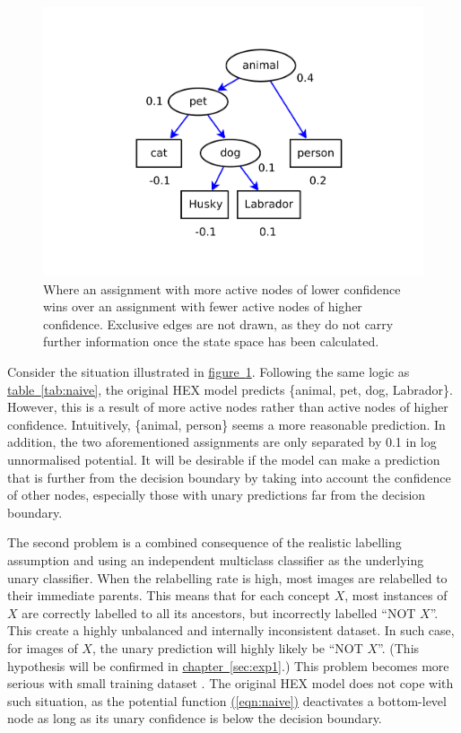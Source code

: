 \documentclass[11pt,a4paper]{book}
\begin{document}
\begin{figure}[htbp]
\centering\includegraphics[scale=0.5]{depth.pdf}
\caption{Where an assignment with more active nodes of lower confidence wins over an assignment with fewer active nodes of higher confidence. Exclusive edges are not drawn, as they do not carry further information once the state space has been calculated.}
\label{fig:depth}
\end{figure}

Consider the situation illustrated in \hyperref[fig:depth]{figure~\ref{fig:depth}}. Following the same logic as \hyperref[tab:naive]{table~\ref{tab:naive}}, the original HEX model predicts \{animal, pet, dog, Labrador\}. However, this is a result of more active nodes rather than active nodes of higher confidence. Intuitively, \{animal, person\} seems a more reasonable prediction. In addition, the two aforementioned assignments are only separated by 0.1 in log unnormalised potential. It will be desirable if the model can make a prediction that is further from the decision boundary by taking into account the confidence of other nodes, especially those with unary predictions far from the decision boundary.

The second problem is a combined consequence of the realistic labelling assumption and using an independent multiclass classifier as the underlying unary classifier. When the relabelling rate is high, most images are relabelled to their immediate parents. This means that for each concept $X$, most instances of $X$ are correctly labelled to all its ancestors, but incorrectly labelled ``NOT $X$''. This create a highly unbalanced and internally inconsistent dataset. In such case, for images of $X$, the unary prediction will highly likely be ``NOT $X$''. (This hypothesis will be confirmed in \hyperref[sec:exp1]{chapter~\ref{sec:exp1}}.) This problem becomes more serious with small training dataset \cite{he2009learning}. The original HEX model does not cope with such situation, as the potential function \hyperref[eqn:naive]{(\ref{eqn:naive})} deactivates a bottom-level node as long as its unary confidence is below the decision boundary.
\end{document}
